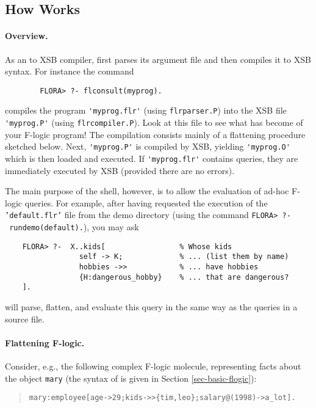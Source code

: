 \documentclass[11pt]{report}
\begin{document}
\subsection{How \FLORA Works}



\paragraph{Overview.}

As an \fl to XSB compiler, \FLORA first parses its argument file and then
compiles it to XSB syntax. For instance the command
\begin{verbatim}
        FLORA> ?- flconsult(myprog).
\end{verbatim}
compiles the program \verb|'myprog.flr'| (using \texttt{flrparser.P}) into
the XSB file \verb|'myprog.P'| (using \texttt{flrcompiler.P}).  Look at
this file to see what has become of your F-logic program! The compilation
consists mainly of a flattening procedure sketched below.  Next,
\verb|'myprog.P'| is compiled by XSB, yielding \verb|'myprog.O'| which is
then loaded and executed.  If \verb|'myprog.flr'| contains queries, they are
immediately executed by XSB (provided there are no errors).

The main purpose of the \FLORA shell, however, is to allow the evaluation
of ad-hoc F-logic queries. For example, after having requested the
execution of the \texttt{'default.flr'} file from the demo directory (using
the command \texttt{FLORA>~?-~rundemo(default).}), you may ask
\begin{verbatim}
    FLORA> ?-  X..kids[                 % Whose kids
                 self -> K;             % ... (list them by name)
                 hobbies ->>            % ... have hobbies
                 {H:dangerous_hobby}    % ... that are dangerous?
    ]. 
\end{verbatim}
\FLORA will parse, flatten, and evaluate this query in the same way as
the queries in a source file.


\paragraph{Flattening F-logic.}

Consider, e.g., the following complex F-logic molecule, representing
facts about the object \texttt{mary} (the syntax of \fl is given in
Section \ref{sec-basic-flogic}):

\begin{quote}
{\small\begin{verbatim}
mary:employee[age->29;kids->>{tim,leo};salary@(1998)->a_lot].
\end{verbatim}}
\end{quote}
\end{document}
